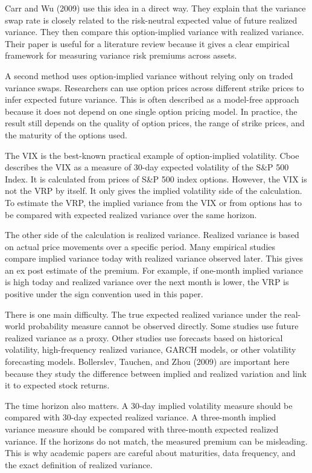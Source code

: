 \documentclass[11pt,a4paper]{article}
\begin{document}
Carr and Wu (2009) use this idea in a direct way. They explain that the variance swap rate is closely related to the risk-neutral expected value of future realized variance. They then compare this option-implied variance with realized variance. Their paper is useful for a literature review because it gives a clear empirical framework for measuring variance risk premiums across assets.

A second method uses option-implied variance without relying only on traded variance swaps. Researchers can use option prices across different strike prices to infer expected future variance. This is often described as a model-free approach because it does not depend on one single option pricing model. In practice, the result still depends on the quality of option prices, the range of strike prices, and the maturity of the options used.

The VIX is the best-known practical example of option-implied volatility. Cboe describes the VIX as a measure of 30-day expected volatility of the S\&P 500 Index. It is calculated from prices of S\&P 500 index options. However, the VIX is not the VRP by itself. It only gives the implied volatility side of the calculation. To estimate the VRP, the implied variance from the VIX or from options has to be compared with expected realized variance over the same horizon.

The other side of the calculation is realized variance. Realized variance is based on actual price movements over a specific period. Many empirical studies compare implied variance today with realized variance observed later. This gives an ex post estimate of the premium. For example, if one-month implied variance is high today and realized variance over the next month is lower, the VRP is positive under the sign convention used in this paper.

There is one main difficulty. The true expected realized variance under the real-world probability measure cannot be observed directly. Some studies use future realized variance as a proxy. Other studies use forecasts based on historical volatility, high-frequency realized variance, GARCH models, or other volatility forecasting models. Bollerslev, Tauchen, and Zhou (2009) are important here because they study the difference between implied and realized variation and link it to expected stock returns.

The time horizon also matters. A 30-day implied volatility measure should be compared with 30-day expected realized variance. A three-month implied variance measure should be compared with three-month expected realized variance. If the horizons do not match, the measured premium can be misleading. This is why academic papers are careful about maturities, data frequency, and the exact definition of realized variance.
\end{document}
